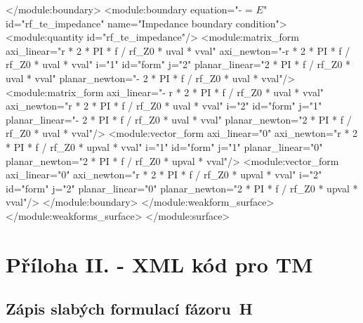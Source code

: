 \documentclass[12pt,a4paper,oneside]{article}
\numberwithin{equation}{section} %
\numberwithin{figure}{section} %
\numberwithin{table}{section} %
\newcommand{\mj}{\mathrm{j}} %
\newcommand{\vecfaz}[1]{\mbox{\underline{\boldmath$#1$}}} %
\begin{document}
\begin{spverbatim}
        </module:boundary>
        <module:boundary equation="-  \frac{\partial \vecfaz{E}}{\partial n_0} = \sqrt{\frac{\varepsilon - \mj \sigma / \omega}{\mu}} \vecfaz{E}" id="rf_te_impedance" name="Impedance boundary condition">
          <module:quantity id="rf_te_impedance"/>
          <module:matrix_form axi_linear="r * 2 * PI * f / rf_Z0 * uval * vval" axi_newton="-r * 2 * PI * f / rf_Z0 * uval * vval" i="1" id="form" j="2" planar_linear="2 * PI * f / rf_Z0 * uval * vval" planar_newton="- 2 * PI * f / rf_Z0 * uval * vval"/>
          <module:matrix_form axi_linear="- r * 2 * PI * f / rf_Z0 * uval * vval" axi_newton="r * 2 * PI * f / rf_Z0 * uval * vval" i="2" id="form" j="1" planar_linear="- 2 * PI * f / rf_Z0 * uval * vval" planar_newton="2 * PI * f / rf_Z0 * uval * vval"/>
          <module:vector_form axi_linear="0" axi_newton="r * 2 * PI * f / rf_Z0 * upval * vval" i="1" id="form" j="1" planar_linear="0" planar_newton="2 * PI * f / rf_Z0 * upval * vval"/>
          <module:vector_form axi_linear="0" axi_newton="r * 2 * PI * f / rf_Z0 * upval * vval" i="2" id="form" j="2" planar_linear="0" planar_newton="2 * PI * f / rf_Z0 * upval * vval"/>
        </module:boundary>
      </module:weakform_surface>
    </module:weakforms_surface>
  </module:surface>
\end{spverbatim}


\newpage
\section*{Příloha II. - XML kód pro TM}
\subsection*{Zápis slabých formulací fázoru~H}
\label{XMLH}
\end{document}
